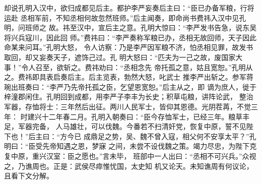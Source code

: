 却说孔明入汉中，欲归成都见后主。都护李严妄奏后主曰：“臣已办备军粮，行将运赴
丞相军前，不知丞相何故忽然班师。”后主闻奏，即命尚书费祎入汉中见孔明，问班师之
故。祎至汉中，宣后主之意。孔明大惊曰：“李严发书告急，说东吴将兴兵寇川，因此回
师。”费祎曰：“李严奏称军粮已办，丞相无故回师，天子因此命某来问耳。”孔明大怒，
令人访察：乃是李严因军粮不济，怕丞相见罪，故发书取回，却又妄奏天子，遮饰己过。孔
明大怒曰：“匹夫为一己之故，废国家大事！”令人召至，欲斩之。费祎劝曰：“丞相念先
帝托孤之意，姑且宽恕。”孔明从之。费祎即具表启奏后主。后主览表，勃然大怒，叱武士
推李严出斩之。参军蒋琬出班奏曰：“李严乃先帝托孤之臣，乞望恩宽恕。”后主从之，即
谪为庶人，徙于梓潼郡闲住。孔明回到成都，用李严子李丰为长史；积草屯粮，讲阵论武，
整治军器，存恤将士：三年然后出征。两川人民军士，皆仰其恩德。光阴茬苒，不觉三年：
时建兴十二年春二月。孔明入朝奏曰：“臣今存恤军士，已经三年。粮草丰足，军器完备，
人马雄壮，可以伐魏。今番若不扫清奸党，恢复中原，誓不见陛下也！”后主曰：“方今已
成鼎足之势，吴、魏不曾入寇，相父何不安享太平？”孔明曰：“臣受先帝知遇之恩，梦寐
之间，未尝不设伐魏之策。竭力尽忠，为陛下克复中原，重兴汉室：臣之愿也。”言未毕，
班部中一人出曰：“丞相不可兴兵。”众视之，乃谯周也。正是：武侯尽瘁惟忧国，太史知
机又论天。未知谯周有何议论，且看下文分解。